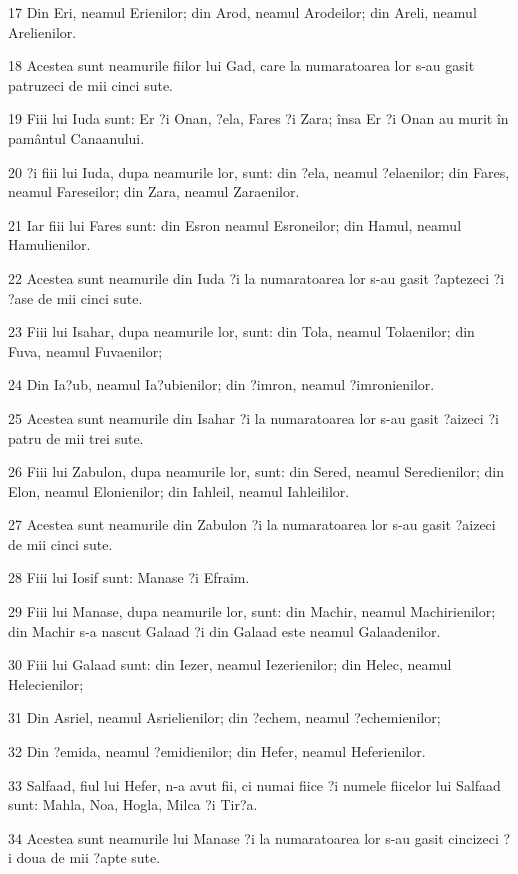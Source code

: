 \par 17 Din Eri, neamul Erienilor; din Arod, neamul Arodeilor; din Areli, neamul Arelienilor.
\par 18 Acestea sunt neamurile fiilor lui Gad, care la numaratoarea lor s-au gasit patruzeci de mii cinci sute.
\par 19 Fiii lui Iuda sunt: Er ?i Onan, ?ela, Fares ?i Zara; însa Er ?i Onan au murit în pamântul Canaanului.
\par 20 ?i fiii lui Iuda, dupa neamurile lor, sunt: din ?ela, neamul ?elaenilor; din Fares, neamul Fareseilor; din Zara, neamul Zaraenilor.
\par 21 Iar fiii lui Fares sunt: din Esron neamul Esroneilor; din Hamul, neamul Hamulienilor.
\par 22 Acestea sunt neamurile din Iuda ?i la numaratoarea lor s-au gasit ?aptezeci ?i ?ase de mii cinci sute.
\par 23 Fiii lui Isahar, dupa neamurile lor, sunt: din Tola, neamul Tolaenilor; din Fuva, neamul Fuvaenilor;
\par 24 Din Ia?ub, neamul Ia?ubienilor; din ?imron, neamul ?imronienilor.
\par 25 Acestea sunt neamurile din Isahar ?i la numaratoarea lor s-au gasit ?aizeci ?i patru de mii trei sute.
\par 26 Fiii lui Zabulon, dupa neamurile lor, sunt: din Sered, neamul Seredienilor; din Elon, neamul Elonienilor; din Iahleil, neamul Iahleililor.
\par 27 Acestea sunt neamurile din Zabulon ?i la numaratoarea lor s-au gasit ?aizeci de mii cinci sute.
\par 28 Fiii lui Iosif sunt: Manase ?i Efraim.
\par 29 Fiii lui Manase, dupa neamurile lor, sunt: din Machir, neamul Machirienilor; din Machir s-a nascut Galaad ?i din Galaad este neamul Galaadenilor.
\par 30 Fiii lui Galaad sunt: din Iezer, neamul Iezerienilor; din Helec, neamul Helecienilor;
\par 31 Din Asriel, neamul Asrielienilor; din ?echem, neamul ?echemienilor;
\par 32 Din ?emida, neamul ?emidienilor; din Hefer, neamul Heferienilor.
\par 33 Salfaad, fiul lui Hefer, n-a avut fii, ci numai fiice ?i numele fiicelor lui Salfaad sunt: Mahla, Noa, Hogla, Milca ?i Tir?a.
\par 34 Acestea sunt neamurile lui Manase ?i la numaratoarea lor s-au gasit cincizeci ?i doua de mii ?apte sute.
